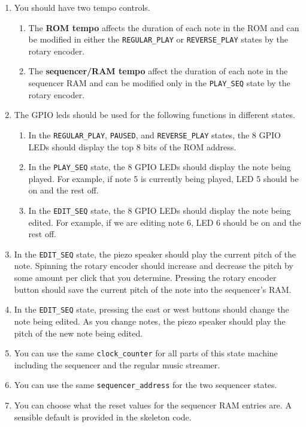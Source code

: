 \documentclass[11pt]{article}
\begin{document}
\begin{enumerate}
	\item You should have two tempo controls. 
	
	\begin{enumerate}
		\item The \textbf{ROM tempo} affects the duration of each note in the ROM and can be modified in either the \verb|REGULAR_PLAY| or \verb|REVERSE_PLAY| states by the rotary encoder.
		\item The \textbf{sequencer/RAM tempo} affect the duration of each note in the sequencer RAM and can be modified only in the \verb|PLAY_SEQ| state by the rotary encoder.
	\end{enumerate}
	
	\item The GPIO leds should be used for the following functions in different states.
	
	\begin{enumerate}
		\item In the \verb|REGULAR_PLAY|, \verb|PAUSED|, and \verb|REVERSE_PLAY| states, the 8 GPIO LEDs should display the top 8 bits of the ROM address.
		\item In the \verb|PLAY_SEQ| state, the 8 GPIO LEDs should display the note being played. For example, if note 5 is currently being played, LED 5 should be on and the rest off.
		\item In the \verb|EDIT_SEQ| state, the 8 GPIO LEDs should display the note being edited. For example, if we are editing note 6, LED 6 should be on and the rest off.
	\end{enumerate}
	
	\item In the \verb|EDIT_SEQ| state, the piezo speaker should play the current pitch of the note. Spinning the rotary encoder should increase and decrease the pitch by some amount per click that you determine. Pressing the rotary encoder button should save the current pitch of the note into the sequencer's RAM.
	
	\item In the \verb|EDIT_SEQ| state, pressing the east or west buttons should change the note being edited. As you change notes, the piezo speaker should play the pitch of the new note being edited.
	
	\item You can use the same \verb|clock_counter| for all parts of this state machine including the sequencer and the regular music streamer.
	
	\item You can use the same \verb|sequencer_address| for the two sequencer states.
	
	\item You can choose what the reset values for the sequencer RAM entries are. A sensible default is provided in the skeleton code.
\end{enumerate}
\end{document}
